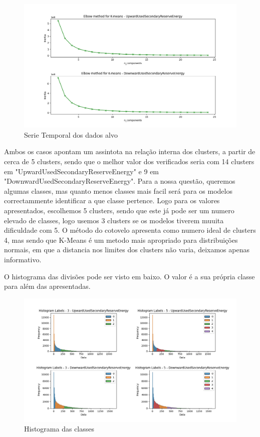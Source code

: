 \begin{figure}[H]
  \centering
  \includegraphics[width=\textwidth]{../plots/elbow_test.png}
  \caption{Serie Temporal dos dados alvo}
\end{figure}


Ambos os casos apontam um assintota na relação interna dos clusters, a partir de cerca de 5 clusters, sendo que o melhor valor dos verificados seria com 14 clusters em "UpwardUsedSecondaryReserveEnergy" e 9 em "DownwardUsedSecondaryReserveEnergy".
Para a nossa questão, queremos algumas classes, mas quanto menos classes mais facil será para os modelos correctammente identificar a que classe pertence. Logo para os valores apresentados, escolhemos 5 clusters, sendo que este já pode ser um numero elevado de classes, logo usemos 3 clusters se os modelos tiverem muuita dificuldade com 5.
O método do cotovelo apresenta como numero ideal de clusters 4, mas sendo que K-Means é um metodo mais apropriado para distribuições normais, em que a distancia nos limites dos clusters não varia, deixamos apenas informativo.

O histograma das divisões pode ser visto em baixo. O valor é a sua própria classe para além das apresentadas.

\begin{figure}[H]
  \centering
  \includegraphics[width=\textwidth]{../plots/clusters_histogram.png}
  \caption{Histograma das classes}
\end{figure}

